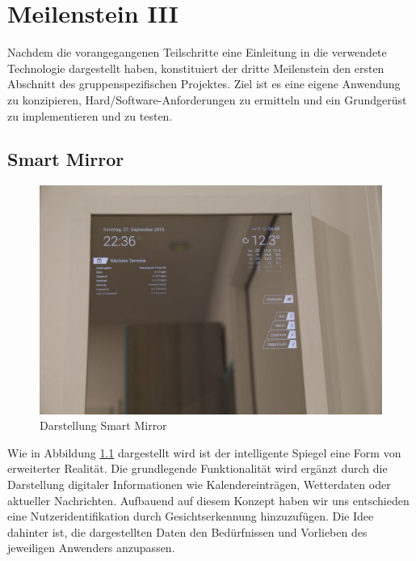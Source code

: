 \chapter{Meilenstein III}
\label{cha:ms3}

Nachdem die vorangegangenen Teilschritte eine Einleitung in die verwendete Technologie dargestellt haben, konstituiert der dritte Meilenstein den ersten Abschnitt des gruppenspezifischen Projektes. Ziel ist es eine eigene Anwendung zu konzipieren, Hard/Software-Anforderungen zu ermitteln und ein Grundgerüst zu implementieren und zu testen.


\section{Smart Mirror}

\begin{figure}
	\centering
	\includegraphics[width=1\textwidth]{figures/sm.JPG}
	\caption{Darstellung Smart Mirror}
	\label{img:imirror}
\end{figure}

Wie in Abbildung \ref{img:imirror} dargestellt wird ist der intelligente Spiegel eine Form von erweiterter Realität. Die grundlegende Funktionalität wird ergänzt durch die Darstellung digitaler Informationen wie Kalendereinträgen, Wetterdaten oder aktueller Nachrichten. Aufbauend auf diesem Konzept haben wir uns entschieden eine Nutzeridentifikation durch Gesichtserkennung hinzuzufügen. Die Idee dahinter ist, die dargestellten Daten den Bedürfnissen und Vorlieben des jeweiligen Anwenders anzupassen. 

